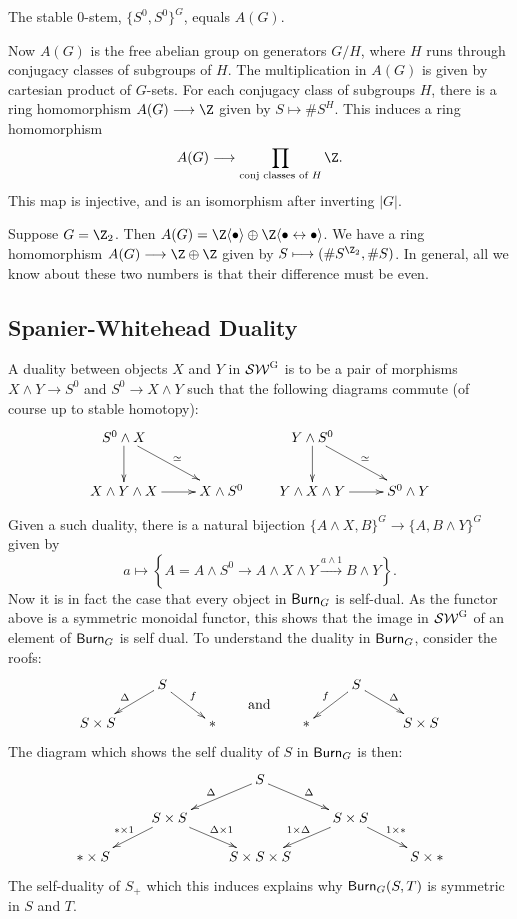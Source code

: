 \documentclass[11pt]{article}
\begin{document}
\begin{cor*}
The stable $0$-stem, $\{S^0,S^0\}^G$, equals $A(G)$.
\end{cor*}
Now $A(G)$ is the free abelian group on generators $G/H$, where $H$ runs through conjugacy classes of subgroups of $H$. The multiplication in $A(G)$ is given by cartesian product of $G$-sets. For each conjugacy class of subgroups $H$, there is a ring homomorphism $A(G)\to\Z$ given by $S\mapsto \# S^H$. This induces a ring homomorphism
\[A(G)\to\prod_\text{conj classes of $H$}\Z.\]
This map is injective, and is an isomorphism after inverting $|G|$.
\begin{exmp*}
Suppose $G=\Z_2$. Then $A(G)=\Z\langle\bullet\rangle\oplus \Z\langle\bullet\leftrightarrow\bullet\rangle$. We have a ring homomorphism $A(G)\to\Z\oplus\Z$ given by $S\mapsto(\#S^{\Z_2},\#S)$. In general, all we know about these two numbers is that their difference must be even.
\end{exmp*}
\subsection*{Spanier-Whitehead Duality}
\begin{defn*}
A duality between objects $X$ and $Y$ in $\operatorname{{\mathcal{SW}^G}}$ is to be a pair of morphisms $X\wedge Y\to S^0$ and $S^0\to X\wedge Y$ such that the following diagrams commute (of course up to stable homotopy):
\[\xymatrix{
S^0\wedge X\ar[d]\ar[dr]^\simeq\\
X\wedge Y\wedge X\ar[r]&X\wedge S^0
}
\qquad\xymatrix{
Y\wedge S^0\ar[d]\ar[dr]^\simeq\\
Y\wedge X\wedge Y\ar[r]&S^0\wedge Y
}\]
\end{defn*}
Given a such duality, there is a natural bijection
$\{A\wedge X,B\}^G\to\{A,B\wedge Y\}^G$ given by
\[a\mapsto\left\{A=A\wedge S^0\to A\wedge X\wedge Y\overset{a\wedge1}{\to}B\wedge Y\right\}.\]
Now it is in fact the case that every object in $\operatorname{{\mathsf{Burn}}}_G$ is self-dual. As the functor above is a symmetric monoidal functor, this shows that the image in $\operatorname{{\mathcal{SW}^G}}$ of an element of $\operatorname{{\mathsf{Burn}}}_G$ is self dual. To understand the duality in $\operatorname{{\mathsf{Burn}}}_G$, consider the roofs:
\[\xymatrix@R=5mm{&S\ar[dl]_\Delta\ar[dr]^f\\S\times S&&\ast}
\qquad\raisebox{-.5cm}{\text{and}}\qquad
\xymatrix@R=5mm{&S\ar[dl]_f\ar[dr]^\Delta\\\ast&&S\times S}\]
The diagram which shows the self duality of $S$ in $\operatorname{{\mathsf{Burn}}}_G$ is then:
\[\xymatrix@R=5mm{
&&S\ar[ld]_\Delta\ar[rd]^\Delta\\
&S\times S\ar[ld]_{\ast\times1}\ar[rd]^{\Delta\times1}&&S\times S\ar[ld]_{1\times\Delta}\ar[rd]^{1\times\ast}\\
\ast\times S&&S\times S\times S&&S\times\ast
}\]
The self-duality of $S_+$ which this induces explains why $\operatorname{{\mathsf{Burn}}}_G(S,T)$ is symmetric in $S$ and $T$.
\end{document}
